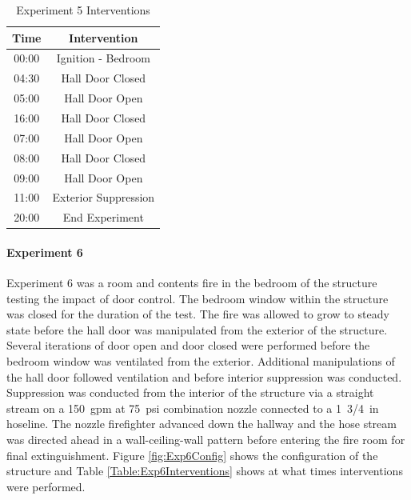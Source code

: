 \documentclass[12pt,oneside]{book}
\begin{document}
\begin{table}[H]
	\centering
	\caption{Experiment 5 Interventions}
	\begin{tabular}{|c|c|} 
		\hline
		Time & Intervention \\ \hline \hline
		00:00 & Ignition - Bedroom \\ \hline
		04:30 & Hall Door Closed \\ \hline
		05:00 & Hall Door Open \\ \hline
		16:00 & Hall Door Closed \\ \hline
		07:00 & Hall Door Open \\ \hline
		08:00 & Hall Door Closed \\ \hline
		09:00 & Hall Door Open \\ \hline
		11:00 & Exterior Suppression \\ \hline
		20:00 & End Experiment\\ \hline
	\end{tabular}
	\label{Table:Exp5Interventions}
\end{table}

\clearpage

\paragraph{Experiment 6} \mbox{}

Experiment 6 was a room and contents fire in the bedroom of the structure testing the impact of door control. The bedroom window within the structure was closed for the duration of the test. The fire was allowed to grow to steady state before the hall door was manipulated from the exterior of the structure. Several iterations of door open and door closed were performed before the bedroom window was ventilated from the exterior. Additional manipulations of the hall door followed ventilation and before interior suppression was conducted. Suppression was conducted from the interior of the structure via a straight stream on a 150~gpm at 75~psi combination nozzle connected to a 1~3/4~in hoseline. The nozzle firefighter advanced down the hallway and the hose stream was directed ahead in a wall-ceiling-wall pattern before entering the fire room for final extinguishment. Figure \ref{fig:Exp6Config} shows the configuration of the structure and Table \ref{Table:Exp6Interventions} shows at what times interventions were performed.

\end{document}
